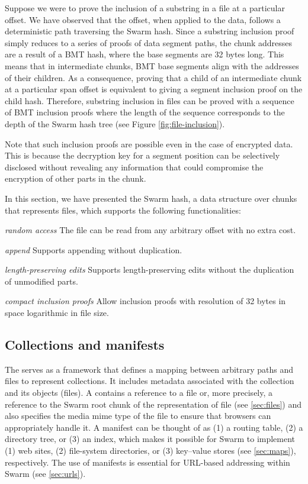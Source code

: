 Suppose we were to prove the inclusion of a substring in a file at a particular offset. We have observed that the offset, when applied to the data, follows a deterministic path traversing the Swarm hash. Since a substring inclusion proof simply reduces to a series of proofs of data segment paths, the chunk addresses are a result of a BMT hash, where the base segments are 32 bytes long. This means that in intermediate chunks, BMT base segments align with the addresses of their children. As a consequence, proving that a child of an intermediate chunk at a particular span offset is equivalent to giving a segment inclusion proof on the child hash. Therefore, substring inclusion in files can be proved with a sequence of BMT inclusion proofs where the length of the sequence corresponds to the depth of the Swarm hash tree (see Figure \ref{fig:file-inclusion}). 


Note that such inclusion proofs are possible even in the case of encrypted data. This is because the decryption key for a segment position can be selectively disclosed without revealing any information that could compromise the encryption of other parts in the chunk.

In this section, we have presented the Swarm hash, a data structure over chunks that represents files, which supports the following functionalities:

\begin{labelledlist}
    \item[\emph{random access}] The file can be read from any arbitrary offset with no extra cost.
    \item[\emph{append}] Supports appending without duplication. 
    \item[\emph{length-preserving edits}] Supports length-preserving edits without the duplication of unmodified parts.
    \item[\emph{compact inclusion proofs}] Allow inclusion proofs with resolution of 32 bytes in space logarithmic in file size.
\end{labelledlist}



\subsection{Collections and manifests\statusgreen}\label{sec:collections}

The  serves as a framework that defines a mapping between arbitrary paths and files to represent collections. It includes metadata associated with the collection and its objects (files). A  contains a reference to a file or, more precisely, a reference to the Swarm root chunk of the representation of file (see \ref{sec:files}) and also specifies the media mime type of the file to ensure that browsers can appropriately handle it. A manifest can be thought of as (1) a routing table, (2) a directory tree, or  (3) an index, which makes it possible for Swarm to implement (1) web sites, (2) file-system directories, or (3) key--value stores (see \ref{sec:maps}), respectively. The use of manifests is essential for URL-based addressing within Swarm (see \ref{sec:urls}). 

